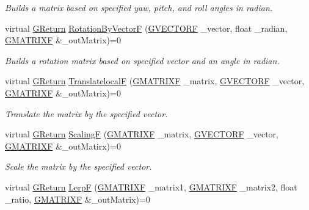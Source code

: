 \begin{DoxyCompactItemize}
\begin{DoxyCompactList}\small\item\em Builds a matrix based on specified yaw, pitch, and roll angles in radian. \end{DoxyCompactList}\item 
virtual \mbox{\hyperlink{namespaceGW_a67a839e3df7ea8a5c5686613a7a3de21}{G\+Return}} \mbox{\hyperlink{classGW_1_1MATH_1_1GMatrix_a2dded0d4aa97a7b6c1b885292a441574}{Rotation\+By\+VectorF}} (\mbox{\hyperlink{structGW_1_1MATH_1_1GVECTORF}{G\+V\+E\+C\+T\+O\+RF}} \+\_\+vector, float \+\_\+radian, \mbox{\hyperlink{structGW_1_1MATH_1_1GMATRIXF}{G\+M\+A\+T\+R\+I\+XF}} \&\+\_\+out\+Matrix)=0
\begin{DoxyCompactList}\small\item\em Builds a rotation matrix based on specified vector and an angle in radian. \end{DoxyCompactList}\item 
virtual \mbox{\hyperlink{namespaceGW_a67a839e3df7ea8a5c5686613a7a3de21}{G\+Return}} \mbox{\hyperlink{classGW_1_1MATH_1_1GMatrix_aee43c6ff9c28dbac026b529bef61c236}{TranslatelocalF}} (\mbox{\hyperlink{structGW_1_1MATH_1_1GMATRIXF}{G\+M\+A\+T\+R\+I\+XF}} \+\_\+matrix, \mbox{\hyperlink{structGW_1_1MATH_1_1GVECTORF}{G\+V\+E\+C\+T\+O\+RF}} \+\_\+vector, \mbox{\hyperlink{structGW_1_1MATH_1_1GMATRIXF}{G\+M\+A\+T\+R\+I\+XF}} \&\+\_\+out\+Matrix)=0
\begin{DoxyCompactList}\small\item\em Translate the matrix by the specified vector. \end{DoxyCompactList}\item 
virtual \mbox{\hyperlink{namespaceGW_a67a839e3df7ea8a5c5686613a7a3de21}{G\+Return}} \mbox{\hyperlink{classGW_1_1MATH_1_1GMatrix_a4342d54e82d03d18e493368e87e90137}{ScalingF}} (\mbox{\hyperlink{structGW_1_1MATH_1_1GMATRIXF}{G\+M\+A\+T\+R\+I\+XF}} \+\_\+matrix, \mbox{\hyperlink{structGW_1_1MATH_1_1GVECTORF}{G\+V\+E\+C\+T\+O\+RF}} \+\_\+vector, \mbox{\hyperlink{structGW_1_1MATH_1_1GMATRIXF}{G\+M\+A\+T\+R\+I\+XF}} \&\+\_\+out\+Matirx)=0
\begin{DoxyCompactList}\small\item\em Scale the matrix by the specified vector. \end{DoxyCompactList}\item 
virtual \mbox{\hyperlink{namespaceGW_a67a839e3df7ea8a5c5686613a7a3de21}{G\+Return}} \mbox{\hyperlink{classGW_1_1MATH_1_1GMatrix_a677534c072e7cb8d93223fdc05ae1957}{LerpF}} (\mbox{\hyperlink{structGW_1_1MATH_1_1GMATRIXF}{G\+M\+A\+T\+R\+I\+XF}} \+\_\+matrix1, \mbox{\hyperlink{structGW_1_1MATH_1_1GMATRIXF}{G\+M\+A\+T\+R\+I\+XF}} \+\_\+matrix2, float \+\_\+ratio, \mbox{\hyperlink{structGW_1_1MATH_1_1GMATRIXF}{G\+M\+A\+T\+R\+I\+XF}} \&\+\_\+out\+Matrix)=0

\end{DoxyCompactItemize}

